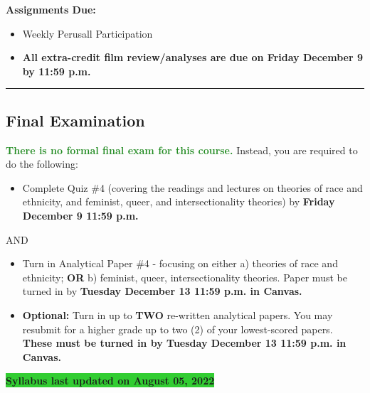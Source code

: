 \documentclass[11pt,]{article}
\providecommand{\tightlist}{%
  \setlength{\itemsep}{0pt}\setlength{\parskip}{0pt}}
\begin{document}
\textbf{Assignments Due:}

\begin{itemize}
\tightlist
\item
  Weekly Perusall Participation
\item
  \textbf{All extra-credit film review/analyses are due on Friday
  December 9 by 11:59 p.m.}
\end{itemize}

\bigbreak
\hrule

\hypertarget{final-examination}{%
\subsection{Final Examination}\label{final-examination}}

\textcolor{ForestGreen}{\bf{There is no formal final exam for this course.}}
Instead, you are required to do the following:

\begin{itemize}
\tightlist
\item
  Complete Quiz \#4 (covering the readings and lectures on theories of
  race and ethnicity, and feminist, queer, and intersectionality
  theories) by \textbf{Friday December 9 11:59 p.m.}
\end{itemize}

AND

\begin{itemize}
\item
  Turn in Analytical Paper \#4 - focusing on either a) theories of race
  and ethnicity; \textbf{OR} b) feminist, queer, intersectionality
  theories. Paper must be turned in by \textbf{Tuesday December 13 11:59
  p.m. in Canvas.}
\item
  \textcolor{BrickRed}{\bf{Optional:}} Turn in up to \textbf{TWO}
  re-written analytical papers. You may resubmit for a higher grade up
  to two (2) of your lowest-scored papers. \textbf{These must be turned
  in by Tuesday December 13 11:59 p.m. in Canvas.}
\end{itemize}

\textbf{\colorbox{LimeGreen}{Syllabus last updated on August 05, 2022}}
\end{document}
